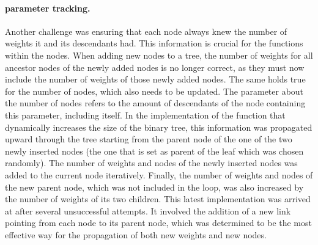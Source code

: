 \paragraph{parameter tracking.}
Another challenge was ensuring that each node always knew the number of weights it and its descendants had. This information is crucial for the functions within the nodes. When adding new nodes to a tree, the number of weights for all ancestor nodes of the newly added nodes is no longer correct, as they must now include the number of weights of those newly added nodes. The same holds true for the number of nodes, which also needs to be updated. The parameter about the number of nodes refers to the amount of descendants of the node containing this parameter, including itself. In the implementation of the function that dynamically increases the size of the binary tree, this information was propagated upward through the tree starting from the parent node of the one of the two newly inserted nodes (the one that is set as parent of the leaf which was chosen randomly). The number of weights and nodes of the newly inserted nodes was added to the current node iteratively. Finally, the number of weights and nodes of the new parent node, which was not included in the loop, was also increased by the number of weights of its two children. This latest implementation was arrived at after several unsuccessful attempts. It involved the addition of a new link pointing from each node to its parent node, which was determined to be the most effective way for the propagation of both new weights and new nodes.